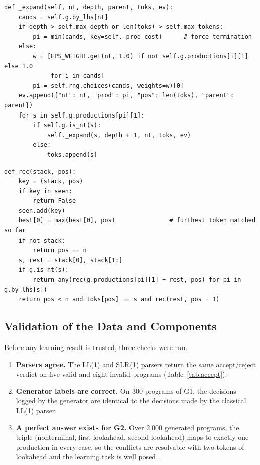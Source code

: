 \documentclass[12pt,a4paper]{article}
\begin{document}
\begin{lstlisting}[caption={Random leftmost derivation that records labelled decisions (generator.py).}]
def _expand(self, nt, depth, parent, toks, ev):
    cands = self.g.by_lhs[nt]
    if depth > self.max_depth or len(toks) > self.max_tokens:
        pi = min(cands, key=self._prod_cost)      # force termination
    else:
        w = [EPS_WEIGHT.get(nt, 1.0) if not self.g.productions[i][1] else 1.0
             for i in cands]
        pi = self.rng.choices(cands, weights=w)[0]
    ev.append({"nt": nt, "prod": pi, "pos": len(toks), "parent": parent})
    for s in self.g.productions[pi][1]:
        if self.g.is_nt(s):
            self._expand(s, depth + 1, nt, toks, ev)
        else:
            toks.append(s)
\end{lstlisting}

\begin{lstlisting}[caption={Exact reference recognizer returning validity and the longest viable prefix (oracle.py).}]
def rec(stack, pos):
    key = (stack, pos)
    if key in seen:
        return False
    seen.add(key)
    best[0] = max(best[0], pos)               # furthest token matched so far
    if not stack:
        return pos == n
    s, rest = stack[0], stack[1:]
    if g.is_nt(s):
        return any(rec(g.productions[pi][1] + rest, pos) for pi in g.by_lhs[s])
    return pos < n and toks[pos] == s and rec(rest, pos + 1)
\end{lstlisting}

\subsection{Validation of the Data and Components}

Before any learning result is trusted, three checks were run.

\begin{enumerate}
    \item \textbf{Parsers agree.} The LL(1) and SLR(1) parsers return the same
    accept/reject verdict on five valid and eight invalid programs
    (Table~\ref{tab:accept}).
    \item \textbf{Generator labels are correct.} On 300 programs of G1, the
    decisions logged by the generator are identical to the decisions made by the
    classical LL(1) parser.
    \item \textbf{A perfect answer exists for G2.} Over 2,000 generated programs,
    the triple (nonterminal, first lookahead, second lookahead) maps to exactly
    one production in every case, so the conflicts are resolvable with two
    tokens of lookahead and the learning task is well posed.
\end{enumerate}
\end{document}

